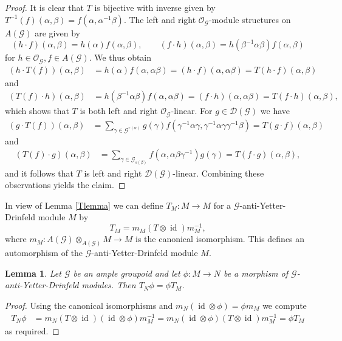\documentclass{amsart}
\newtheorem{lemma}[thm]{Lemma}
\newcommand{\G}{\mathcal{G}}
\newcommand{\DG}{\mathcal{D}(\mathcal{G})}
\newcommand{\OG}{\mathcal{O}_{\mathcal{G}}}
\DeclareMathOperator{\id}{id}
\begin{document}
\begin{proof}
It is clear that $ T $ is bijective with inverse given by $ T^{-1}(f)(\alpha, \beta) = f(\alpha, \alpha^{-1} \beta) $. The left and right $ \OG $-module structures on $ A(\G) $ are given by 
$$
(h \cdot f)(\alpha, \beta) = h(\alpha) f(\alpha, \beta), \qquad 
(f \cdot h)(\alpha, \beta) = h(\beta^{-1}\alpha \beta) f(\alpha, \beta)
$$
for $ h \in \OG, f \in A(\G) $. We thus obtain 
\begin{align*}
(h \cdot T(f))(\alpha, \beta) &= h(\alpha) f(\alpha, \alpha\beta) 
= (h \cdot f)(\alpha, \alpha \beta) = T(h \cdot f)(\alpha, \beta) 
\end{align*}
and 
\begin{align*}
(T(f) \cdot h)(\alpha, \beta) &= h(\beta^{-1}\alpha \beta) f(\alpha, \alpha\beta) 
= (f \cdot h)(\alpha, \alpha \beta) = T(f \cdot h)(\alpha, \beta), 
\end{align*}
which shows that $ T $ is both left and right $ \OG $-linear. 
For $ g \in \DG $ we have
\begin{align*}
(g \cdot T(f))(\alpha, \beta) &= \sum_{\gamma \in \G^{r(\alpha)}} g(\gamma) f(\gamma^{-1}\alpha\gamma, \gamma^{-1} \alpha \gamma \gamma^{-1}\beta) 
= T(g \cdot f)(\alpha, \beta) 
\end{align*}
and 
\begin{align*}
(T(f) \cdot g)(\alpha, \beta) &= \sum_{\gamma \in \G_{s(\beta)}} 
f(\alpha, \alpha \beta \gamma^{-1}) g(\gamma) 
= T(f \cdot g)(\alpha, \beta), 
\end{align*}
and it follows that $ T $ is left and right $ \DG $-linear. Combining these observations yields the claim. 
\end{proof}

In view of Lemma \ref{Tlemma} we can define $ T_M: M \rightarrow M $ for a $ \G $-anti-Yetter-Drinfeld module $ M $ by 
$$
T_M = m_M(T \otimes \id)m_M^{-1}, 
$$
where $ m_M: A(\G) \otimes_{A(\G)} M \rightarrow M $ is the canonical isomorphism. This defines an automorphism of the $ \G $-anti-Yetter-Drinfeld module $ M $. 

\begin{lemma} \label{automaticcommutation}
Let $ \G $ be an ample groupoid and let $ \phi: M \rightarrow N $ be a morphism of $ \G $-anti-Yetter-Drinfeld modules. Then $ T_N \phi = \phi T_M $. 
\end{lemma}

\begin{proof}
Using the canonical isomorphisms and $ m_N (\id \otimes \phi) = \phi m_M $ we compute
\begin{align*}
T_N \phi &= m_N (T \otimes \id) (\id \otimes \phi) m_M^{-1} 
= m_N (\id \otimes \phi) (T \otimes \id) m_M^{-1} = \phi T_M 
\end{align*}
as required. 
\end{proof}
\end{document}
